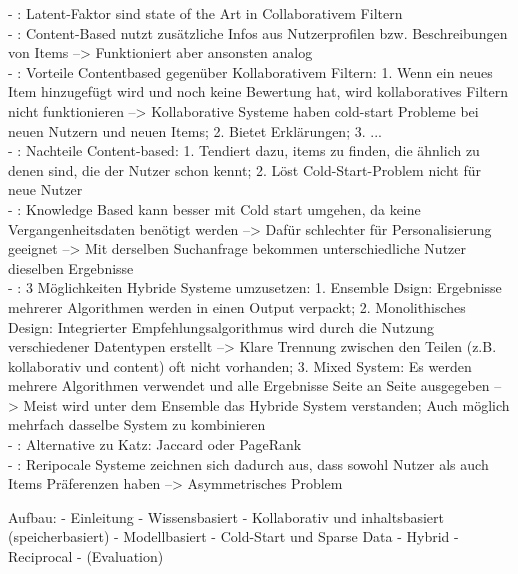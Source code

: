 - \cite[S. 134]{recommenderSystems:2016}: Latent-Faktor sind state of the Art in Collaborativem Filtern\\
- \cite{recommenderSystems:2016}: Content-Based nutzt zusätzliche Infos aus Nutzerprofilen bzw. Beschreibungen von Items --> Funktioniert aber ansonsten analog\\
- \cite[S. 161]{recommenderSystems:2016}: Vorteile Contentbased gegenüber Kollaborativem Filtern: 1. Wenn ein neues Item hinzugefügt wird und noch keine Bewertung hat, wird kollaboratives Filtern nicht funktionieren --> Kollaborative Systeme haben cold-start Probleme bei neuen Nutzern und neuen Items; 2. Bietet Erklärungen; 3. ...\\
- \cite[S. 161]{recommenderSystems:2016}: Nachteile Content-based: 1. Tendiert dazu, items zu finden, die ähnlich zu denen sind, die der Nutzer schon kennt; 2. Löst Cold-Start-Problem nicht für neue Nutzer\\
- \cite[S. 199]{recommenderSystems:2016}: Knowledge Based kann besser mit Cold start umgehen, da keine Vergangenheitsdaten benötigt werden --> Dafür schlechter für Personalisierung geeignet --> Mit derselben Suchanfrage bekommen unterschiedliche Nutzer dieselben Ergebnisse\\
- \cite[S. 199f.]{recommenderSystems:2016}: 3 Möglichkeiten Hybride Systeme umzusetzen: 1. Ensemble Dsign: Ergebnisse mehrerer Algorithmen werden in einen Output verpackt; 2. Monolithisches Design: Integrierter Empfehlungsalgorithmus wird durch die Nutzung verschiedener Datentypen erstellt --> Klare Trennung zwischen den Teilen (z.B. kollaborativ und content) oft nicht vorhanden; 3. Mixed System: Es werden mehrere Algorithmen verwendet und alle Ergebnisse Seite an Seite ausgegeben --> Meist wird unter dem Ensemble das Hybride System verstanden; Auch möglich mehrfach dasselbe System zu kombinieren\\
- \cite[S. 328]{recommenderSystems:2016}: Alternative zu Katz: Jaccard oder PageRank\\
- \cite[S. 443]{recommenderSystems:2016}: Reripocale Systeme zeichnen sich dadurch aus, dass sowohl Nutzer als auch Items Präferenzen haben --> Asymmetrisches Problem



\newpage
Aufbau:
- Einleitung
- Wissensbasiert
- Kollaborativ und inhaltsbasiert (speicherbasiert)
- Modellbasiert
- Cold-Start und Sparse Data
- Hybrid
- Reciprocal
- (Evaluation)

